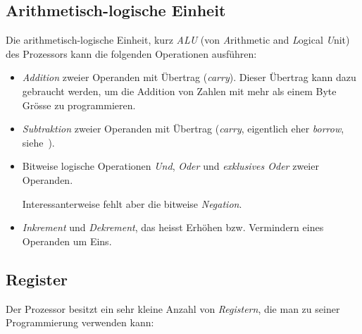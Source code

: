 \documentclass[11pt]{scrartcl}
\begin{document}
\subsection{Arithmetisch-logische Einheit}
\label{sec:alu}


Die arithmetisch-logische Einheit, kurz \emph{ALU} (von
\emph{A}rithmetic and \emph{L}ogical \emph{U}nit) des Prozessors kann
die folgenden Operationen ausführen:

\begin{itemize}
\item \emph{Addition} zweier Operanden mit Übertrag
  (\emph{carry}). Dieser Übertrag kann dazu gebraucht werden, um die
  Addition von Zahlen mit mehr als einem Byte Grösse zu programmieren.
    
\item \emph{Subtraktion} zweier Operanden mit Übertrag (\emph{carry},
  eigentlich eher \emph{borrow}, siehe~\cite{kenshirriff6502overflow}).
\item Bitweise logische Operationen \emph{Und}, \emph{Oder} und
  \emph{exklusives Oder} zweier Operanden.
    
  Interessanterweise fehlt aber die bitweise \emph{Negation}.
\item \emph{Inkrement} und \emph{Dekrement}, das heisst Erhöhen
  bzw. Vermindern eines Operanden um Eins.
\end{itemize}

\subsection{Register}
\label{sec:register}


Der Prozessor besitzt ein sehr kleine Anzahl von
\emph{Registern}, die man zu seiner Programmierung verwenden kann:
\end{document}
